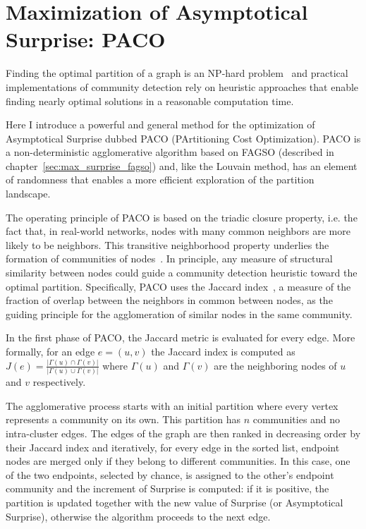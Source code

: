 \section{Maximization of Asymptotical Surprise: PACO}
Finding the optimal partition of a graph is an NP-hard problem~\cite{fortunato2010} and practical implementations of community detection rely on heuristic approaches that enable finding nearly optimal solutions in a reasonable computation time.

Here I introduce a powerful and general method for the optimization of Asymptotical Surprise dubbed PACO (PArtitioning Cost Optimization).
PACO is a non-deterministic agglomerative algorithm based on FAGSO (described in chapter~\ref{sec:max_surprise_fagso}) and, like the Louvain method, has an element of randomness that enables a more efficient exploration of the partition landscape.

The operating principle of PACO is based on the triadic closure property, i.e.
the fact that, in real-world networks, nodes with many common neighbors are more likely to be neighbors.
This transitive neighborhood property underlies the formation of communities of nodes~\cite{bianconi2014,eustace2015}.
In principle, any measure of structural similarity between nodes could guide a community detection heuristic toward the optimal partition.
Specifically, PACO uses the Jaccard index~\cite{jaccard1901}, a measure of the fraction of overlap between the neighbors in common between nodes, as the guiding principle for the agglomeration of similar nodes in the same community.

In the first phase of PACO, the Jaccard metric is evaluated for every edge.
More formally, for an edge $e=(u,v)$ the Jaccard index is computed as $J(e)=\frac{|\Gamma(u) \cap \Gamma(v)|}{|\Gamma(u) \cup \Gamma(v)|}$ where $\Gamma(u)$ and $\Gamma(v)$ are the neighboring nodes of $u$ and $v$ respectively.

The agglomerative process starts with an initial partition where every vertex represents a community on its own.
This partition has $n$ communities and no intra-cluster edges.
The edges of the graph are then ranked in decreasing order by their Jaccard index and iteratively, for every edge in the sorted list, endpoint nodes are merged only if they belong to different communities.
In this case, one of the two endpoints, selected by chance, is assigned to the other's endpoint community and the increment of Surprise is computed: if it is positive, the partition is updated together with the new value of Surprise (or Asymptotical Surprise), otherwise the algorithm proceeds to the next edge.


